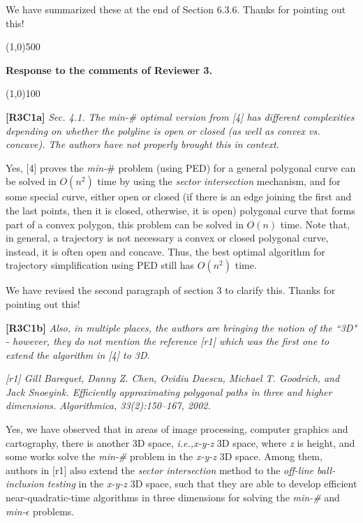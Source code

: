 \documentclass{letter}
\newcommand{\ie}{\emph{i.e.,}\xspace}
\begin{document}
{{We have summarized these at the end of Section 6.3.6. Thanks for pointing out this!


\line(1,0){500}

\textbf{Response to the comments of Reviewer 3.}

\line(1,0){100}

\textbf{[R3C1a]} \emph{
Sec. 4.1. The min-\# optimal version from [4] has different complexities depending on whether the polyline is open or closed (as well as convex vs. concave). The authors have not properly brought this in context.}

Yes, [4] proves the \emph{min-$\#$} problem (using PED) for a general polygonal curve can be solved in $O(n^2)$ time by using the \textit{sector intersection} mechanism, and for some special curve, either open or closed (if there is an edge joining the first and the last points, then it is closed, otherwise, it is open) polygonal curve that forms part of a convex polygon, this problem can be solved in $O(n)$ time. Note that, in general, a trajectory is not necessary a convex or closed polygonal curve, instead, it is often open and concave. Thus, the best optimal algorithm for trajectory simplification using PED still has $O(n^2)$ time.} 

We have revised the second paragraph of section 3 to clarify this. Thanks for pointing out this!

\textbf{[R3C1b]} \emph{Also, in multiple places, the authors are bringing the notion of the ``3D" - however, they do not mention the reference [r1] which was the first one to extend the algorithm in [4] to 3D. }

\emph{[r1] Gill Barequet, Danny Z. Chen, Ovidiu Daescu, Michael T. Goodrich, and Jack Snoeyink. Efficiently approximating polygonal paths in three and higher dimensions. Algorithmica, 33(2):150–167, 2002.}

Yes, we have observed that in areas of image processing, computer graphics and cartography, there is another 3D space, \ie \emph{x-y-z} 3D space, where {\em z} is height, and some works solve the \emph{min-\#} problem in the \emph{x-y-z} 3D space. Among them, authors in [r1] also extend the \textit{sector intersection} method to the \textit{off-line ball-inclusion testing} in the \emph{x-y-z} 3D space, such that they are able to develop efficient near-quadratic-time algorithms in three dimensions for solving the \emph{min-\#} and \emph{min-$\epsilon$} problems.} %
\end{document}
